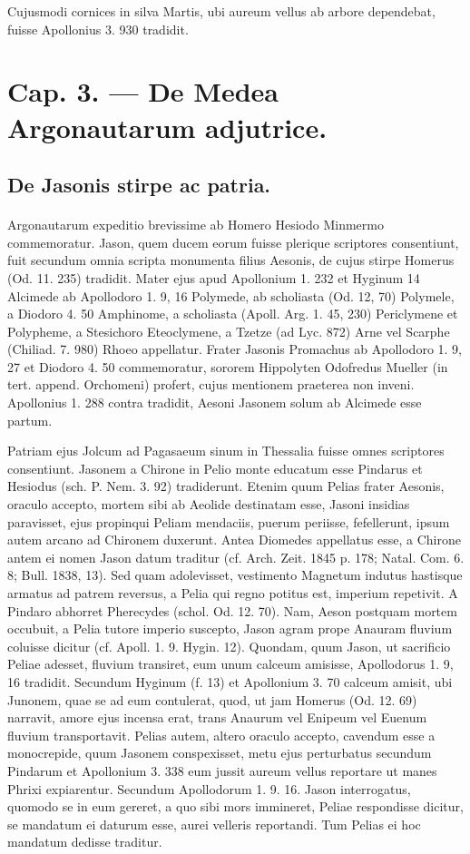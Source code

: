 \documentclass[a4paper, 11pt, oneside, polutonikogreek, german]{article}
\begin{document}
Cujusmodi cornices in silva Martis, ubi aureum vellus ab arbore dependebat, fuisse Apollonius 3. 930 tradidit.
\clearpage
\section{Cap. 3. --- De Medea Argonautarum adjutrice.}
\subsection{De Jasonis stirpe ac patria.}
\paragraph{}
Argonautarum expeditio brevissime ab Homero Hesiodo Minmermo commemoratur. Jason, quem ducem eorum fuisse plerique scriptores consentiunt, fuit secundum omnia scripta monumenta filius Aesonis, de cujus stirpe Homerus (Od. 11. 235) tradidit. Mater ejus apud Apollonium 1. 232 et Hyginum 14 Alcimede ab Apollodoro 1. 9, 16 Polymede, ab scholiasta (Od. 12, 70) Polymele, a Diodoro 4. 50 Amphinome, a scholiasta (Apoll. Arg. 1. 45, 230) Periclymene et Polypheme, a Stesichoro Eteoclymene, a Tzetze (ad Lyc. 872) Arne vel Scarphe (Chiliad. 7. 980) Rhoeo appellatur. Frater Jasonis Promachus ab Apollodoro 1. 9, 27 et Diodoro 4. 50 commemoratur, sororem Hippolyten Odofredus Mueller (in tert. append. Orchomeni) profert, cujus mentionem praeterea non inveni. Apollonius 1. 288 contra tradidit, Aesoni Jasonem solum ab Alcimede esse partum.

Patriam ejus Jolcum ad Pagasaeum sinum in Thessalia fuisse omnes scriptores consentiunt. Jasonem a Chirone in Pelio monte educatum esse Pindarus et Hesiodus (sch. P. Nem. 3. 92) tradiderunt. Etenim quum Pelias frater Aesonis, oraculo accepto, mortem sibi ab Aeolide destinatam esse, Jasoni insidias paravisset, ejus propinqui Peliam mendaciis, puerum periisse, fefellerunt, ipsum autem arcano ad Chironem duxerunt. Antea Diomedes appellatus esse, a Chirone antem ei nomen Jason datum traditur (cf. Arch. Zeit. 1845 p. 178; Natal. Com. 6. 8; Bull. 1838, 13). Sed quam adolevisset, vestimento Magnetum indutus hastisque armatus ad patrem reversus, a Pelia qui regno potitus est, imperium repetivit. A Pindaro abhorret Pherecydes (schol. Od. 12. 70). Nam, Aeson postquam mortem occubuit, a Pelia tutore imperio suscepto, Jason agram prope Anauram fluvium coluisse dicitur (cf. Apoll. 1. 9. Hygin. 12). Quondam, quum Jason, ut sacrificio Peliae adesset, fluvium transiret, eum unum calceum amisisse, Apollodorus 1. 9, 16 tradidit. Secundum Hyginum (f. 13) et Apollonium 3. 70 calceum amisit, ubi Junonem, quae se ad eum contulerat, quod, ut jam Homerus (Od. 12. 69) narravit, amore ejus incensa erat, trans Anaurum vel Enipeum vel Euenum fluvium transportavit. Pelias autem, altero oraculo accepto, cavendum esse a monocrepide, quum Jasonem conspexisset, metu ejus perturbatus secundum Pindarum et Apollonium 3. 338 eum jussit aureum vellus reportare ut manes Phrixi expiarentur. Secundum Apollodorum 1. 9. 16. Jason interrogatus, quomodo se in eum gereret, a quo sibi mors immineret, Peliae respondisse dicitur, se mandatum ei daturum esse, aurei velleris reportandi. Tum Pelias ei hoc mandatum dedisse traditur.
\end{document}
